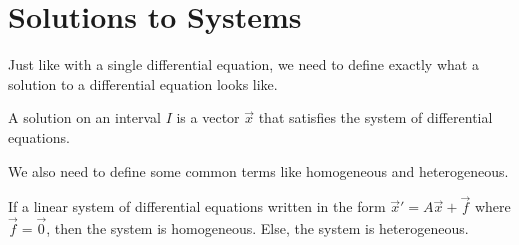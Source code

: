 \section{Solutions to Systems}
\noindent
Just like with a single differential equation, we need to define exactly what a solution to a differential equation looks like.
\begin{definition}
	A solution on an interval $I$ is a vector $\vec{x}$ that satisfies the system of differential equations.
\end{definition}

\noindent
We also need to define some common terms like homogeneous and heterogeneous.
\begin{definition}
	If a linear system of differential equations written in the form $\vec{x}' = A\vec{x} + \vec{f}$ where $\vec{f} = \vec{0}$, then the system is homogeneous. Else, the system is heterogeneous.
\end{definition}

\ifodd{}\fi